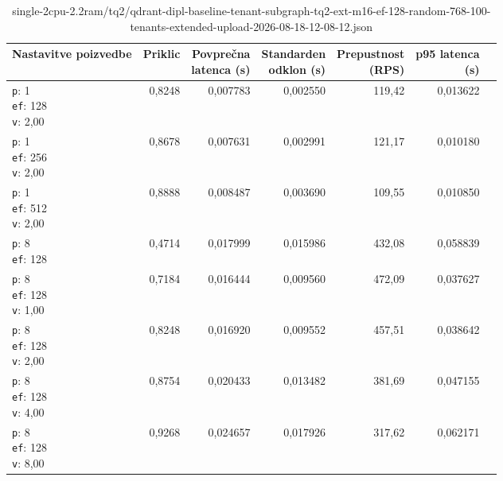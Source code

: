 \begin{table}[htbp]
  \centering
\small
  \caption{single-2cpu-2.2ram/tq2/qdrant-dipl-baseline-tenant-subgraph-tq2-ext-m16-ef-128-random-768-100-tenants-extended-upload-2026-08-18-12-08-12.json}
  \label{tab:single-2cpu-2.2ram:tq2:qdrant-dipl-baseline-tenant-subgraph-tq2-ext-m16-ef-128-random-768-100-tenants-extended-upload-2026-08-18-12-08-12.json}
  \begin{tabularx}{\textwidth}{Xrrrrrr}
    \toprule
    Nastavitve poizvedbe & Priklic & \makecell{Povprečna\\latenca (s)} & \makecell{Standarden\\odklon (s)} & \makecell{Prepustnost\\(RPS)} & \makecell{p95 latenca\\(s)}  \\
    \midrule
    \makecell{\texttt{p}: 1\\\texttt{ef}: 128\\\texttt{v}: 2,00} & 0,8248 & 0,007783 & 0,002550 & 119,42 & 0,013622 \\
    \makecell{\texttt{p}: 1\\\texttt{ef}: 256\\\texttt{v}: 2,00} & 0,8678 & 0,007631 & 0,002991 & 121,17 & 0,010180 \\
    \makecell{\texttt{p}: 1\\\texttt{ef}: 512\\\texttt{v}: 2,00} & 0,8888 & 0,008487 & 0,003690 & 109,55 & 0,010850 \\
    \makecell{\texttt{p}: 8\\\texttt{ef}: 128} & 0,4714 & 0,017999 & 0,015986 & 432,08 & 0,058839 \\
    \makecell{\texttt{p}: 8\\\texttt{ef}: 128\\\texttt{v}: 1,00} & 0,7184 & 0,016444 & 0,009560 & 472,09 & 0,037627 \\
    \makecell{\texttt{p}: 8\\\texttt{ef}: 128\\\texttt{v}: 2,00} & 0,8248 & 0,016920 & 0,009552 & 457,51 & 0,038642 \\
    \makecell{\texttt{p}: 8\\\texttt{ef}: 128\\\texttt{v}: 4,00} & 0,8754 & 0,020433 & 0,013482 & 381,69 & 0,047155 \\
    \makecell{\texttt{p}: 8\\\texttt{ef}: 128\\\texttt{v}: 8,00} & 0,9268 & 0,024657 & 0,017926 & 317,62 & 0,062171 \\

\end{tabularx}
\end{table}
